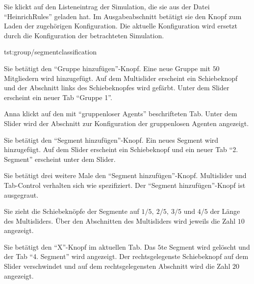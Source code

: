 \documentclass[parskip=full,11pt]{scrartcl}
\begin{document}
{Sie klickt auf den Listeneintrag der Simulation, die sie aus der Datei \enquote{HeinrichRules} geladen hat. Im Ausgabeabschnitt betätigt sie den Knopf zum Laden der zugehörigen \Gls{Konfiguration}.}
{Die \gls{aktuelle Konfiguration} wird ersetzt durch die \Gls{Konfiguration} der betrachteten Simulation.}

{tst:group/segmentclassification}

{Sie betätigt den \enquote{Gruppe hinzufügen}-Knopf.}
{Eine neue Gruppe mit \(50\) Mitgliedern wird hinzugefügt. Auf dem \Gls{Multislider} erscheint ein Schiebeknopf und der Abschnitt links des Schiebeknopfes wird gefärbt. Unter dem Slider erscheint ein neuer Tab \enquote{Gruppe 1}.}

{Anna klickt auf den mit \enquote{\Glspl{gruppenloser Agent}} beschrifteten Tab.}
{Unter dem Slider wird der Abschnitt zur \Gls{Konfiguration} der gruppenlosen Agenten angezeigt.}

{Sie betätigt den \enquote{Segment hinzufügen}-Knopf.}
{Ein neues Segment wird hinzugefügt. Auf dem Slider erscheint ein Schiebeknopf und ein neuer Tab \enquote{2. Segment} erscheint unter dem Slider.}

{Sie betätigt drei weitere Male den \enquote{Segment hinzufügen}-Knopf.}
{\Gls{Multislider} und Tab-Control verhalten sich wie spezifiziert. Der \enquote{Segment hinzufügen}-Knopf ist ausgegraut.}

{Sie zieht die Schiebeknöpfe der Segmente auf \(1/5,\ 2/5,\ 3/5 \text{ und } 4/5\) der Länge des \Glspl{Multislider}.}
{Über den Abschnitten des \Glspl{Multislider} wird jeweils die Zahl \(10\) angezeigt.}

{Sie betätigt den \enquote{X}-Knopf im aktuellen Tab.}
{Das \(5\)te Segment wird gelöscht und der Tab \enquote{4. Segment} wird angezeigt. Der rechtsgelegenste Schiebeknopf auf dem Slider verschwindet und auf dem rechtsgelegensten Abschnitt wird die Zahl \(20\) angezeigt.}
\end{document}
